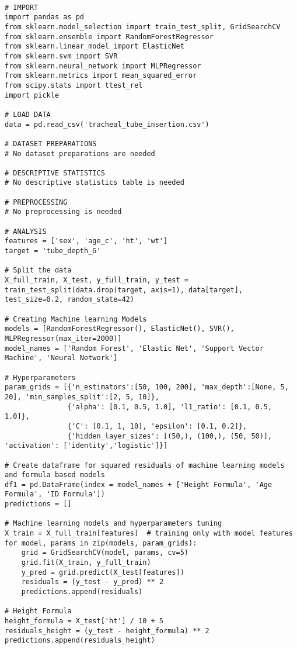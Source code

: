 \documentclass[11pt]{article}
\begin{document}
\begin{verbatim}

# IMPORT
import pandas as pd
from sklearn.model_selection import train_test_split, GridSearchCV
from sklearn.ensemble import RandomForestRegressor
from sklearn.linear_model import ElasticNet
from sklearn.svm import SVR
from sklearn.neural_network import MLPRegressor
from sklearn.metrics import mean_squared_error
from scipy.stats import ttest_rel
import pickle

# LOAD DATA
data = pd.read_csv('tracheal_tube_insertion.csv')

# DATASET PREPARATIONS
# No dataset preparations are needed

# DESCRIPTIVE STATISTICS
# No descriptive statistics table is needed

# PREPROCESSING
# No preprocessing is needed

# ANALYSIS
features = ['sex', 'age_c', 'ht', 'wt']
target = 'tube_depth_G'

# Split the data
X_full_train, X_test, y_full_train, y_test = train_test_split(data.drop(target, axis=1), data[target], test_size=0.2, random_state=42)

# Creating Machine learning Models
models = [RandomForestRegressor(), ElasticNet(), SVR(), MLPRegressor(max_iter=2000)]
model_names = ['Random Forest', 'Elastic Net', 'Support Vector Machine', 'Neural Network']

# Hyperparameters
param_grids = [{'n_estimators':[50, 100, 200], 'max_depth':[None, 5, 20], 'min_samples_split':[2, 5, 10]},
               {'alpha': [0.1, 0.5, 1.0], 'l1_ratio': [0.1, 0.5, 1.0]},
               {'C': [0.1, 1, 10], 'epsilon': [0.1, 0.2]},
               {'hidden_layer_sizes': [(50,), (100,), (50, 50)], 'activation': ['identity','logistic']}]

# Create dataframe for squared residuals of machine learning models and formula based models
df1 = pd.DataFrame(index = model_names + ['Height Formula', 'Age Formula', 'ID Formula'])
predictions = []

# Machine learning models and hyperparameters tuning
X_train = X_full_train[features]  # training only with model features
for model, params in zip(models, param_grids):
    grid = GridSearchCV(model, params, cv=5)
    grid.fit(X_train, y_full_train)
    y_pred = grid.predict(X_test[features])
    residuals = (y_test - y_pred) ** 2
    predictions.append(residuals)

# Height Formula
height_formula = X_test['ht'] / 10 + 5
residuals_height = (y_test - height_formula) ** 2
predictions.append(residuals_height)


\end{verbatim}
\end{document}
